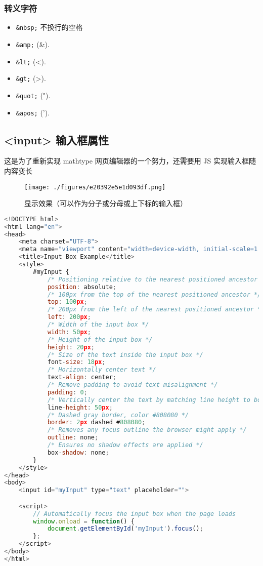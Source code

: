 \subsubsection{转义字符}
\begin{itemize}
\item \verb`&nbsp;` 不换行的空格
\item \verb`&amp;` (&).
\item \verb`&lt;` (<).
\item \verb`&gt;` (>).
\item \verb`&quot;` (").
\item \verb`&apos;` (').
\end{itemize}

\subsection{<input> 输入框属性}
这是为了重新实现 mathtype 网页编辑器的一个努力，还需要用 JS 实现输入框随内容变长

\begin{figure}[ht]
\centering
\texttt{[image: ./figures/e20392e5e1d093df.png]}
\caption{显示效果（可以作为分子或分母或上下标的输入框）} \label{fig_html_1}
\end{figure}

\begin{lstlisting}[language=js,caption=input\_box.html]
<!DOCTYPE html>
<html lang="en">
<head>
	<meta charset="UTF-8">
	<meta name="viewport" content="width=device-width, initial-scale=1.0">
	<title>Input Box Example</title>
	<style>
		#myInput {
			/* Positioning relative to the nearest positioned ancestor */
			position: absolute;
			/* 100px from the top of the nearest positioned ancestor */
			top: 100px;
			/* 200px from the left of the nearest positioned ancestor */
			left: 200px;
			/* Width of the input box */
			width: 50px;
			/* Height of the input box */
			height: 20px;
			/* Size of the text inside the input box */
			font-size: 18px;
			/* Horizontally center text */
			text-align: center;
			/* Remove padding to avoid text misalignment */
			padding: 0;
			/* Vertically center the text by matching line height to box height */
			line-height: 50px;
			/* Dashed gray border, color #808080 */
			border: 2px dashed #808080;
			/* Removes any focus outline the browser might apply */
			outline: none;
			/* Ensures no shadow effects are applied */
			box-shadow: none;
		}
	</style>
</head>
<body>
	<input id="myInput" type="text" placeholder="">

	<script>
		// Automatically focus the input box when the page loads
		window.onload = function() {
			document.getElementById('myInput').focus();
		};
	</script>
</body>
</html>
\end{lstlisting}
